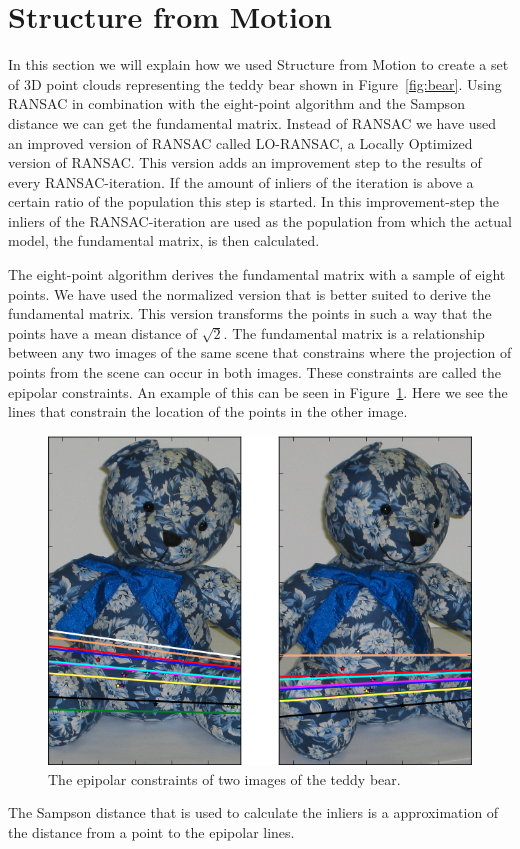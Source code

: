 \section{Structure from Motion}
\label{structure}
In this section we will explain how we used Structure from Motion\cite{SfM} to create a set of 3D point clouds representing the teddy bear shown in Figure~\ref{fig:bear}.
Using RANSAC\cite{ransac} in combination with the eight-point algorithm\cite{eightpoint} and the Sampson distance we can get the fundamental matrix.
Instead of RANSAC we have used an improved version of RANSAC called LO-RANSAC, a Locally Optimized version of RANSAC.
This version adds an improvement step to the results of every RANSAC-iteration. If the amount of inliers of the iteration is above a certain ratio of the population this step is started.
In this improvement-step the inliers of the RANSAC-iteration are used as the population from which the actual model, the fundamental matrix, is then calculated.

The eight-point algorithm derives the fundamental matrix with a sample of eight points.
We have used the normalized version that is better suited to derive the fundamental matrix.
This version transforms the points in such a way that the points have a mean distance of $\sqrt{2}$.
The fundamental matrix is a relationship between any two images of the same scene that constrains where the projection of points from the scene can occur in both images.
These constraints are called the epipolar constraints.
An example of this can be seen in Figure~\ref{fig:epipolar}.
Here we see the lines that constrain the location of the points in the other image.
\begin{figure}[ht]
	\centering
	\includegraphics[width=.5\textwidth]{bear_epi}
	\caption{The epipolar constraints of two images of the teddy bear.}
	\label{fig:epipolar}
\end{figure}

The Sampson distance that is used to calculate the inliers is a approximation of the distance from a point to the epipolar lines.

